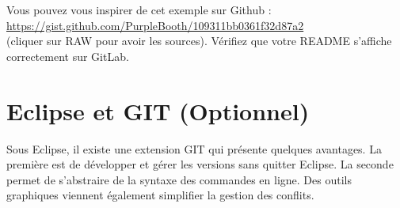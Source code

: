 \documentclass[final, a4paper, openbib, ]{article}
\begin{document}
Vous pouvez vous inspirer de cet exemple sur Github :\\
\url{https://gist.github.com/PurpleBooth/109311bb0361f32d87a2}\\
(cliquer sur RAW pour avoir les sources).
Vérifiez que votre README s'affiche correctement sur GitLab.



\section{Eclipse et GIT (Optionnel)}

Sous Eclipse, il existe une extension GIT qui présente quelques avantages. La première est de développer et gérer les versions sans quitter Eclipse. La seconde permet de s'abstraire de la syntaxe des commandes en ligne. Des outils graphiques viennent également simplifier la gestion des conflits.
\end{document}
